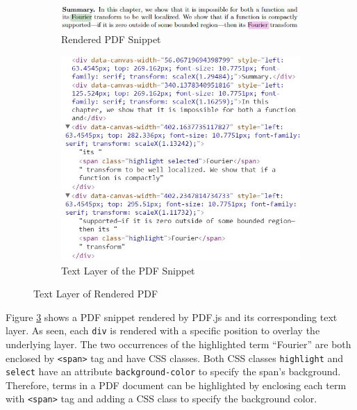 \begin{figure}[!htbp]
\centering
 
  \begin{subfigure}{.9\textwidth}
  \centering
  \includegraphics[width=\linewidth]{implementation/example_pdf.jpg}
  \caption{Rendered PDF Snippet}
  \label{fig:sfig:pdf_snippet}
  \end{subfigure}
  
  \begin{subfigure}{.9\textwidth}
  \centering
  \includegraphics[width=\linewidth]{implementation/example_text_layer.jpg}
  \caption{Text Layer of the PDF Snippet}
  \label{fig:sfig:text_layer}
  \end{subfigure}
 
\caption{Text Layer of Rendered PDF}
\label{fig:text_layer}
\end{figure}

Figure \ref{fig:text_layer} shows a PDF snippet rendered by PDF.js and its corresponding text layer. As seen, each \texttt{div} is rendered with a specific position to overlay the underlying layer. The two occurrences of the highlighted term \enquote{Fourier} are both enclosed by \texttt{<span>} tag and have CSS classes. Both CSS classes \texttt{highlight} and \texttt{select} have an attribute \texttt{background-color} to specify the span's background. Therefore, terms in a PDF document can be highlighted by enclosing each term with \texttt{<span>} tag and adding a CSS class to specify the background color.

